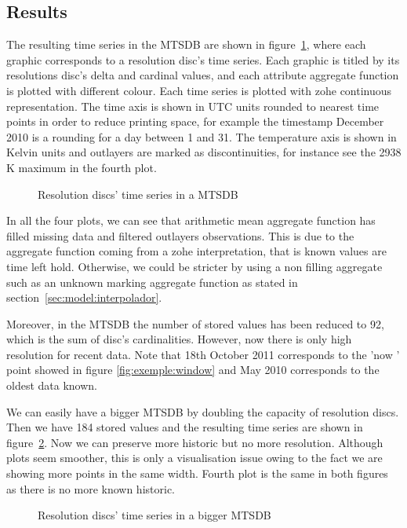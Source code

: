 \subsection{Results}

The resulting time series in the MTSDB are shown in
figure~\ref{fig:exemple:4mrd}, where each graphic corresponds to a
resolution disc's time series. Each graphic is titled by its
resolutions disc's delta and cardinal values, and each attribute
aggregate function is plotted with different colour.  Each time series
is plotted with zohe continuous representation. The time axis is shown
in UTC units rounded to nearest time points in order to reduce
printing space, for example the timestamp December 2010 is a rounding
for a day between 1 and 31. The temperature axis is shown in Kelvin
units and outlayers are marked as discontinuities, for instance see
the 2938 K maximum in the fourth plot.


\begin{figure}[tp]
  \centering
  
  \caption{Resolution discs' time series in a MTSDB}
  \label{fig:exemple:4mrd}
\end{figure}


In all the four plots, we can see that arithmetic mean aggregate
function has filled missing data and filtered outlayers
observations. This is due to the aggregate function coming from a zohe
interpretation, that is known values are time left hold. Otherwise, we
could be stricter by using a non filling aggregate such as an unknown
marking aggregate function as stated in
section~\ref{sec:model:interpolador}.

Moreover, in the MTSDB the number of stored values has been reduced to
92, which is the sum of disc's cardinalities. However, now there is
only high resolution for recent data. Note that 18th October 2011
corresponds to the 'now ' point showed in figure
\ref{fig:exemple:window} and May 2010 corresponds to the oldest data
known.


We  can  easily  have a  bigger  MTSDB  by  doubling the  capacity  of
resolution discs.  Then we  have 184 stored  values and  the resulting
time series are  shown in figure~\ref{fig:exemple:4mrdbigger}.  Now we
can preserve more historic but no more resolution. Although plots seem
smoother, this is only a visualisation  issue owing to the fact we are
showing more points in the same width. Fourth plot is the same in both
figures as there is no more known historic.

\begin{figure}[tp]
  \centering
  
  \caption{Resolution discs' time series in a bigger MTSDB}
  \label{fig:exemple:4mrdbigger}
\end{figure}



